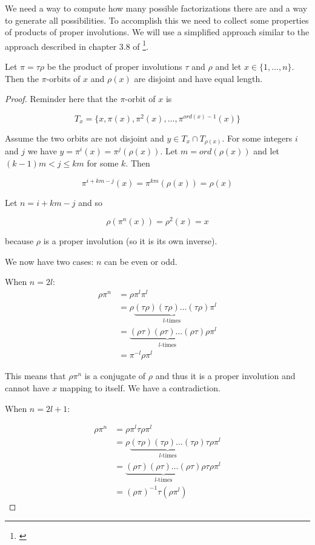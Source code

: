 We need a way to compute how many possible factorizations there are and a way to generate all possibilities. To accomplish this we need to collect some properties of products of proper involutions. We will use a simplified approach similar to the approach described in chapter 3.8 of \citet{lawrence2021introduction}\footnote{\cite{lawrence2021introduction}}.

\begin{thm}\label{involutionproduct}
Let $\pi = \tau \rho$ be the product of proper involutions $\tau$ and $\rho$ and let $x \in \{1, \ldots, n\}$. Then the $\pi$-orbits of $x$ and $\rho(x)$ are disjoint and have equal length.
\end{thm}

\begin{proof}

Reminder here that the $\pi$-orbit of $x$ is 

$$
T_x = \{x, \pi(x), \pi^2(x), \ldots, \pi^{ord(x)-1}(x)\}
$$

Assume the two orbits are not disjoint and $y \in T_x \cap T_{\rho(x)}$. For some integers $i$ and $j$ we have $y = \pi^i(x) = \pi^j(\rho(x))$. Let $m = ord(\rho(x))$ and let $(k - 1) m < j \leq k m$ for some $k$. Then 

$$
\pi^{i + k m - j} (x) = \pi^{k m} (\rho(x)) = \rho(x)
$$

Let $n = i + k m - j$ and so

$$
\rho (\pi^n (x)) = \rho^2(x) = x
$$

because $\rho$ is a proper involution (so it is its own inverse).

We now have two cases: $n$ can be even or odd.

When $n = 2 l$:
\begin{align*}
\rho \pi^n &= \rho \pi^l \pi^l \\
           &= \rho \underbrace{(\tau\rho) (\tau\rho) \ldots (\tau\rho)}_{l\text{-times}}  \pi^l \\
           &= \underbrace{(\rho \tau) (\rho \tau) \ldots (\rho \tau)}_{l\text{-times}} \rho \pi^l \\
           &= \pi^{-l} \rho \pi^l
\end{align*}

This means that $\rho \pi^n$ is a conjugate of $\rho$ and thus it is a proper involution and cannot have $x$ mapping to itself. We have a contradiction.

When $n = 2 l + 1$:

\begin{align*}
\rho \pi^n &= \rho \pi^l \tau \rho \pi^l \\
           &= \rho \underbrace{(\tau\rho) (\tau\rho) \ldots (\tau\rho)}_{l\text{-times}}  \tau \rho \pi^l \\
           &= \underbrace{(\rho \tau) (\rho \tau) \ldots (\rho \tau)}_{l\text{-times}} \rho \tau \rho \pi^l \\
           &= (\rho \pi)^{-1} \tau (\rho \pi^l)
\end{align*}


\end{proof}
